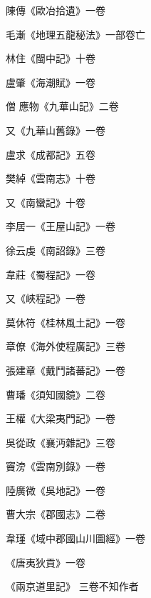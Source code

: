 \begin{pinyinscope}
 陳傳《歐冶拾遺》一卷



 毛漸《地理五龍秘法》一部卷亡



 林住《閩中記》十卷



 盧肇《海潮賦》一卷



 僧
 應物《九華山記》二卷



 又《九華山舊錄》一卷



 盧求《成都記》五卷



 樊綽《雲南志》十卷



 又《南蠻記》十卷



 李居一《王屋山記》一卷



 徐云虔《南詔錄》三卷



 韋莊《蜀程記》一卷



 又《峽程記》一卷



 莫休符《桂林風土記》一卷



 章僚《海外使程廣記》三卷



 張建章《戴鬥諸蕃記》一卷



 曹璠《須知國鏡》二卷



 王權《大梁夷門記》一卷



 吳從政《襄沔雜記》三卷



 竇滂《雲南別錄》一卷



 陸廣微《吳地記》一卷



 曹大宗《郡國志》二卷



 韋瑾《域中郡國山川圖經》一卷



 《唐夷狄貢》一卷



 《兩京道里記》
 三卷不知作者




\end{pinyinscope}
